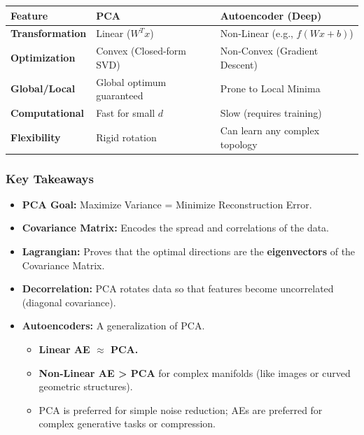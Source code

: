 \documentclass[
  italian,
  11pt,
]{article}
\newcounter{none} %
\begin{document}
{\def\LTcaptype{none} %
\begin{longtable}[]{@{}
  >{\raggedright\arraybackslash}p{}
  >{\raggedright\arraybackslash}p{}
  >{\raggedright\arraybackslash}p{}@{}}
\toprule\noalign{}
\begin{minipage}[b]{\linewidth}\raggedright
\textbf{Feature}
\end{minipage} & \begin{minipage}[b]{\linewidth}\raggedright
\textbf{PCA}
\end{minipage} & \begin{minipage}[b]{\linewidth}\raggedright
\textbf{Autoencoder (Deep)}
\end{minipage} \\
\midrule\noalign{}
\endhead
\bottomrule\noalign{}
\endlastfoot
\textbf{Transformation} & Linear (\(W^T x\)) & Non-Linear (e.g.,
\(f(W x + b)\)) \\
\textbf{Optimization} & Convex (Closed-form SVD) & Non-Convex (Gradient
Descent) \\
\textbf{Global/Local} & Global optimum guaranteed & Prone to Local
Minima \\
\textbf{Computational} & Fast for small \(d\) & Slow (requires
training) \\
\textbf{Flexibility} & Rigid rotation & Can learn any complex
topology \\
\end{longtable}
}

\subsubsection{Key Takeaways}\label{key-takeaways-25}

\begin{itemize}
\item
  \textbf{PCA Goal:} Maximize Variance = Minimize Reconstruction Error.
\item
  \textbf{Covariance Matrix:} Encodes the spread and correlations of the
  data.
\item
  \textbf{Lagrangian:} Proves that the optimal directions are the
  \textbf{eigenvectors} of the Covariance Matrix.
\item
  \textbf{Decorrelation:} PCA rotates data so that features become
  uncorrelated (diagonal covariance).
\item
  \textbf{Autoencoders:} A generalization of PCA.

  \begin{itemize}
  \item
    \textbf{Linear AE \(\approx\) PCA.}
  \item
    \textbf{Non-Linear AE \textgreater{} PCA} for complex manifolds
    (like images or curved geometric structures).
  \item
    PCA is preferred for simple noise reduction; AEs are preferred for
    complex generative tasks or compression.
  \end{itemize}
\end{itemize}
\end{document}

